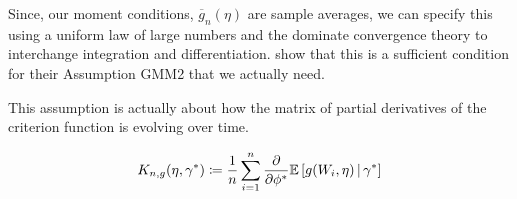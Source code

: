 \documentclass[11pt]{article}
\newcommand*{\E}{\mathbb{E}}
\newcommand*{\popmom}{\ensuremath{g}}
\newcommand*{\sampmom}{\ensuremath{\overline{g}_n}}
\newcommand{\mvert}[1][\middle]{\ensuremath{\,#1\vert\,}}
\begin{document}
Since, our moment conditions, $\sampmom(\eta)$ are sample averages, we can specify this using a uniform
law of large numbers and the dominate convergence theory to interchange integration and differentiation.
\textcite{andrewsGmm2014} show that this is a sufficient condition for their Assumption GMM2 that we actually
need.

This assumption is actually about how the matrix of partial derivatives of the criterion function is
evolving over time. 

\begin{defn}
    \label{defn:moment_derivative_func}
    \begin{equation}
        K_{n,g}(\eta, \gamma^{*}) \coloneqq  \frac{1}{n} \sum_{i=1}^n \frac{\partial}{\partial \phi^{*}} \E \left[
        \popmom(W_i, \eta) \mvert \gamma^{*} \right]
    \end{equation}
\end{defn}
\end{document}
